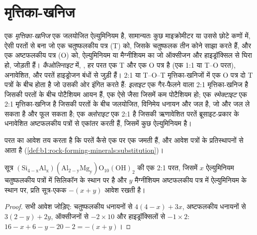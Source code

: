 \section{मृत्तिका-खनिज}\label{sec:b1:weathering-clays:clays}

\begin{definition}[मृत्तिका-खनिज, कैओलिनाइट, इलाइट, स्मेक्टाइट, क्लोराइट]
\label{def:b1:weathering-clays:clay-mineral}
एक \emph{मृत्तिका-खनिज} एक जलयोजित ऐल्युमिनियम  है, सामान्यतः कुछ माइक्रोमीटर या उससे छोटे कणों में, ऐसी परतों से बना जो एक चतुष्फलकीय पत्र (T) को, जिसके  चतुष्फलक तीन कोने साझा करते हैं, और एक अष्टफलकीय पत्र (O) को, ऐल्युमिनियम या मैग्नीशियम का जो ऑक्सीजन और हाइड्रॉक्सिल से घिरा हो, जोड़ती हैं। \emph{कैओलिनाइट} में, , हर परत एक T और एक O पत्र है (एक 1:1 या T--O परत), अनावेशित, और परतें हाइड्रोजन बंधों से जुड़ी हैं। 2:1 या T--O--T मृत्तिका-खनिजों में एक O पत्र दो T पत्रों के बीच होता है जो उसकी ओर इंगित करते हैं: \emph{इलाइट} एक गैर-फैलने वाला 2:1 मृत्तिका-खनिज है जिसकी परतों के बीच पोटैशियम आयन हैं, एक ऐसे  जैसा जिसमें कम पोटैशियम हो; एक \emph{स्मेक्टाइट} एक 2:1 मृत्तिका-खनिज है जिसकी परतों के बीच जलयोजित, विनिमेय धनायन और जल है, जो और जल ले सकता है और फूल सकता है; एक \emph{क्लोराइट} एक 2:1  है जिसकी ऋणावेशित परतें ब्रूसाइट-प्रकार के धनावेशित अष्टफलकीय पत्रों से एकांतर करती हैं,  जिसमें कुछ ऐल्युमिनियम है।
\end{definition}

परत का आवेश तय करता है कि परतें कैसे एक पर एक जमती हैं, और आवेश पत्रों के प्रतिस्थापनों से आता है (\cref{def:b1:rock-forming-minerals:substitution})।

\begin{proposition}[2:1 परत का आवेश]\label{prop:b1:weathering-clays:layer-charge}
सूत्र $\mathrm{(Si_{4-x}Al_x)(Al_{2-y}Mg_y)O_{10}(OH)_2}$ की एक 2:1 परत, जिसमें $x$ ऐल्युमिनियम चतुष्फलकीय पत्रों में सिलिकॉन के स्थान पर है और $y$ मैग्नीशियम अष्टफलकीय पत्र में ऐल्युमिनियम के स्थान पर, प्रति सूत्र-एकक $-(x + y)$ आवेश रखती है।
\end{proposition}

\begin{proof}
सभी आवेश जोड़िए: चतुष्फलकीय धनायनों से $4(4 - x) + 3x$, अष्टफलकीय धनायनों से
$3(2 - y) + 2y$, ऑक्सीजनों से $-2\times10$ और हाइड्रॉक्सिलों से $-1\times2$:
$16 - x + 6 - y - 20 - 2 = -(x + y)$।
\end{proof}

